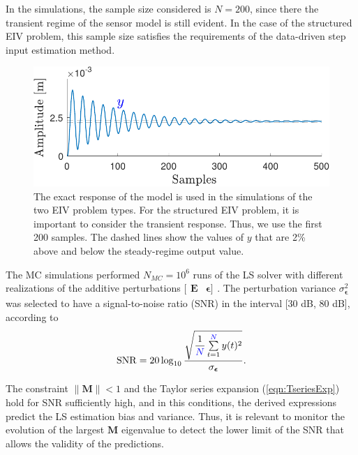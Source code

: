 In the simulations, the sample size considered is $N=200$, since there the transient regime of the sensor model is still evident. 
In the case of the structured EIV problem, this sample size satisfies the requirements of the data-driven step input estimation method. 

\begin{figure}[htb!]
\centering
\includegraphics[width=0.69\columnwidth]{./ChapterStatisticalAnalysis/fig/Fig_1.pdf} 
\caption{ \label{fig:y} \color{blue} The exact response of the model is used in the simulations of the two EIV problem types. For the structured EIV problem, it is important to consider the transient response. Thus, we use the first 200 samples. The dashed lines show the values of ${y}$ that are 2\% above and below the steady-regime output value\color{black}. } 
\end{figure}

\color{black}

The MC simulations performed $N_{MC} = 10^6$ runs of the LS solver with different realizations of the additive perturbations $[\begin{matrix} \mathbf{E} & \bm{\epsilon}] \end{matrix}$.
The perturbation variance \color{blue} $\sigma_{\bm{\epsilon}}^2$ \color{black} was selected to have a signal-to-noise ratio (SNR) in the interval [30 dB, 80 dB], according to 
\begin{equation} \mathrm{SNR} = 20 \log_{10}{ \dfrac{ \sqrt{ \dfrac{1}{\color{blue}N\color{black}} \sum\limits_{t=1}^{\color{blue}N\color{black}}{ y(t)^2 } } }{ \sigma_{ \bm{\epsilon}}} } . \label{eqn:SNR} \end{equation} 

The constraint $\| \mathbf{M} \| < 1$ and the Taylor series expansion  (\ref{eqn:TseriesExp}) hold for SNR sufficiently high, and 
in this conditions, the derived expressions \color{blue} predict \color{black} the LS estimation bias and variance.
Thus, it is relevant to monitor the evolution of the largest $\mathbf{M}$ eigenvalue to detect the lower limit of the SNR  that allows the validity of the predictions.

